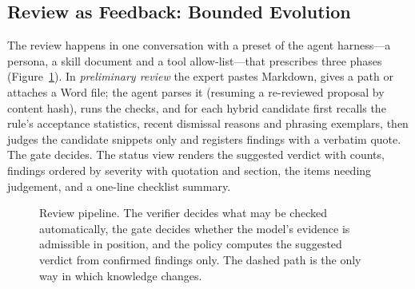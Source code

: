 \documentclass{IOS-Book-Article}
\begin{document}
\subsection{Review as Feedback: Bounded Evolution}

The review happens in one conversation with a preset of the agent harness---a persona, a skill document and a tool allow-list---that prescribes three phases (Figure~\ref{fig:pipeline}). In \emph{preliminary review} the expert pastes Markdown, gives a path or attaches a Word file; the agent parses it (resuming a re-reviewed proposal by content hash), runs the checks, and for each hybrid candidate first recalls the rule's acceptance statistics, recent dismissal reasons and phrasing exemplars, then judges the candidate snippets only and registers findings with a verbatim quote. The gate decides. The status view renders the suggested verdict with counts, findings ordered by severity with quotation and section, the items needing judgement, and a one-line checklist summary.

\begin{figure}[t]
\centering
{}
\caption{Review pipeline. The verifier decides what may be checked automatically, the gate decides whether the model's evidence is admissible in position, and the policy computes the suggested verdict from confirmed findings only. The dashed path is the only way in which knowledge changes.}
\label{fig:pipeline}
\end{figure}
\end{document}
